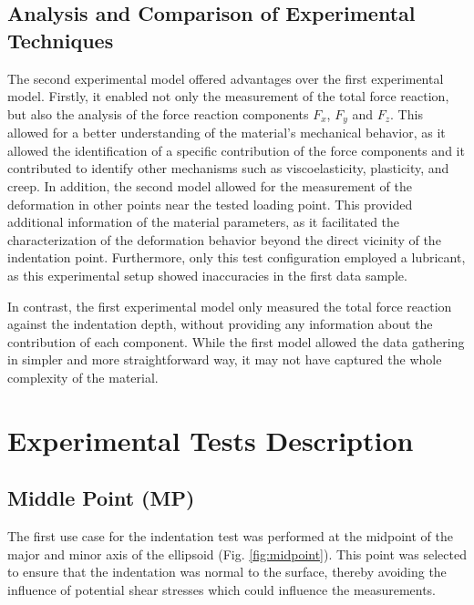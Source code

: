 \subsection*{Analysis and Comparison of Experimental Techniques}

The second experimental model offered advantages over the first  experimental model. 
Firstly, it enabled not only the measurement of the total force reaction, but also the analysis 
of the force reaction components $F_x$, $F_y$ and $F_z$. This allowed for a better 
understanding of the material's mechanical behavior, as it allowed the identification 
of a specific contribution of the force components and it contributed to identify other 
mechanisms such as viscoelasticity, plasticity, and creep. 
In addition, the second model allowed for the measurement of the deformation in other 
points near the tested loading point. This provided additional information of the 
material parameters, as it facilitated the characterization of the deformation behavior beyond the 
direct vicinity of the indentation point. Furthermore, only this test configuration employed a lubricant, 
as this experimental setup showed inaccuracies in the first data sample.

In contrast, the first experimental model only measured the total force reaction 
against the indentation depth, without providing any information about the contribution 
of each component. While the first model allowed the data 
gathering in simpler and more straightforward way, it may not have captured 
the whole complexity of the material.

\section{Experimental Tests Description}

\subsection*{Middle Point (MP)}
\label{subsection:midpoint}
The first use case for the indentation test was performed at the midpoint 
of the major and minor axis of the ellipsoid (Fig. \ref{fig:midpoint}). This point was selected 
to ensure that the indentation was normal to the surface, thereby avoiding 
the influence of potential shear stresses which could influence the 
measurements.

